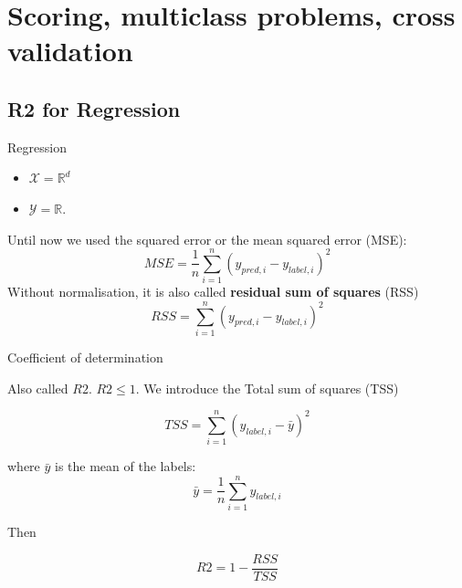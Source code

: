 \documentclass[usenames,dvipsnames]{beamer}
\begin{document}
\section{Scoring, multiclass problems, cross validation}
\frame{\tableofcontents[currentsection]}


\subsection{R2 for Regression}%
\label{sub:regression}


\begin{frame}{Regression}

    \begin{itemize}
        \item $ \mathcal{X} = \mathbb{R}^d$
        \item $ \mathcal{Y}  = \mathbb{R} $.
    \end{itemize}

    Until now we used the squared error or the mean squared error (MSE):
    \begin{equation}
        MSE = \frac{1}{n} \sum^{n}_{i=1} (y_{pred, i}-y_{label, i})^2
    \end{equation}
    Without normalisation, it is also called \textbf{{residual sum of squares}} (RSS)
    \begin{equation}
        RSS = \sum^{n}_{i=1} (y_{pred, i}-y_{label, i})^2
    \end{equation}
    
\end{frame}

\begin{frame}{Coefficient of determination}

        Also called $R2$.  $R2\leq 1$. We introduce the Total sum of squares (TSS)

    \begin{equation}
        TSS = \sum^{n}_{i=1} (y_{label, i}- \bar{y})^2
    \end{equation}

    where $ \bar{y}$ is the mean of the labels:
    \begin{equation}
        \bar{y} = \frac{1}{n} \sum^{n}_{i=1} y_{label, i}
    \end{equation}
    
    Then

    \begin{equation}
        R2 = 1- \frac{RSS}{TSS} 
    \end{equation}
\end{frame}
\end{document}
